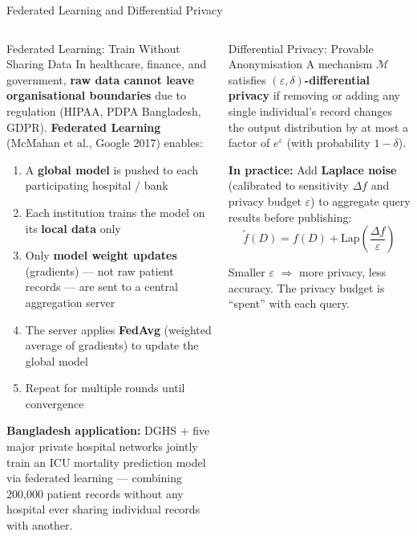 \documentclass[aspectratio=169,10pt]{beamer}
\begin{document}
\begin{frame}{Federated Learning and Differential Privacy}
  \begin{columns}[T]
      \begin{block}{Federated Learning: Train Without Sharing Data}
        In healthcare, finance, and government, \textbf{raw data cannot leave organisational boundaries} due to regulation (HIPAA, PDPA Bangladesh, GDPR).  \textbf{Federated Learning} (McMahan et al., Google 2017) enables:
        \begin{enumerate}
          \item A \textbf{global model} is pushed to each participating hospital / bank
          \item Each institution trains the model on its \textbf{local data} only
          \item Only \textbf{model weight updates} (gradients) --- not raw patient records --- are sent to a central aggregation server
          \item The server applies \textbf{FedAvg} (weighted average of gradients) to update the global model
          \item Repeat for multiple rounds until convergence
        \end{enumerate}
        \vspace{4pt}
        \textbf{Bangladesh application:}  DGHS + five major private hospital networks jointly train an ICU mortality prediction model via federated learning --- combining 200{,}000 patient records without any hospital ever sharing individual records with another.
      \end{block}

      \begin{exampleblock}{Differential Privacy: Provable Anonymisation}
        \small A mechanism $\mathcal{M}$ satisfies \textbf{$(\varepsilon, \delta)$-differential privacy} if removing or adding any single individual's record changes the output distribution by at most a factor of $e^\varepsilon$ (with probability $1-\delta$).
        \vspace{4pt}

        \textbf{In practice:}  Add \textbf{Laplace noise} (calibrated to sensitivity $\Delta f$ and privacy budget $\varepsilon$) to aggregate query results before publishing:
        \[
          \tilde{f}(D) = f(D) + \text{Lap}\!\left(\frac{\Delta f}{\varepsilon}\right)
        \]

        Smaller $\varepsilon$ $\Rightarrow$ more privacy, less accuracy.  The privacy budget is ``spent'' with each query.


\end{exampleblock}
\end{columns}
\end{frame}
\end{document}
